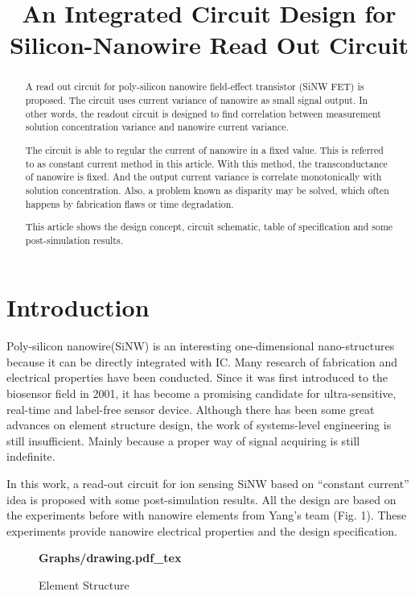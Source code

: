 \documentclass{article}
\title{An Integrated Circuit Design for Silicon-Nanowire Read Out Circuit}
\begin{document}
%
\maketitle
%
\begin{abstract}
A read out circuit for poly-silicon nanowire field-effect transistor (SiNW FET) is proposed.
The circuit uses current variance of nanowire as small signal output.
In other words, the readout circuit is designed to find correlation between measurement solution concentration variance and nanowire current variance.

The circuit is able to regular the current of nanowire in a fixed value.
This is referred to as constant current method in this article.
With this method, the transconductance of nanowire is fixed. And the output current variance is correlate monotonically with solution concentration.
Also, a problem known as disparity may be solved, which often happens by fabrication flaws or time degradation.

This article shows the design concept, circuit schematic, table of specification and some post-simulation results.
\end{abstract}
%
\section{Introduction}
\label{sec:intro}

Poly-silicon nanowire(SiNW) is an interesting one-dimensional nano-structures because it can be directly integrated with IC.
Many research of fabrication and electrical properties have been conducted.
Since it was first introduced to the biosensor field in 2001, it has become a promising candidate for ultra-sensitive, real-time and label-free  sensor device.
Although there has been some great advances on element structure design, the work of systems-level engineering is still insufficient.
Mainly because a proper way of signal acquiring is still indefinite.

In this work, a read-out circuit for ion sensing SiNW based on “constant current” idea is proposed with some post-simulation results.
All the design are based on the experiments before with nanowire elements from Yang's team (Fig. 1\cite{J7}).
These experiments provide nanowire electrical properties and the design specification.





\begin{figure}[b]
    \centering
    {\selectfont\textbf{
        \def\svgwidth{5.0cm}
        \fontsize{6}{7}\selectfont
         {Graphs/drawing.pdf_tex}
    }}
    \fontsize{6}{7}\selectfont
    \caption{Element Structure}
    \label{fig:res}
\end{figure}
\end{document}
